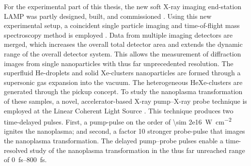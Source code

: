 %
For the experimental part of this thesis, the new soft X-ray imaging end-station LAMP was partly designed, built, and commissioned \citep{Ferguson-2015-JSR}. Using this new experimental setup, a coincident single particle imaging and time-of-flight mass spectroscopy method is employed \cite{Gorkhover-2012-PRL}. Data from multiple imaging detectors are merged, which increases the overall total detector area and extends the dynamic range of the overall detector system. This allows the measurement of diffraction images from single nanoparticles with thus far unprecedented resolution. The superfluid He-droplets and solid Xe-clusters nanoparticles are formed through a supersonic gas expansion into the vacuum. The heterogeneous HeXe-clusters are generated through the pickup concept. To study the nanoplasma transformation of these samples, a novel, accelerator-based X-ray pump--X-ray probe technique is employed at the Linear Coherent Light Source \cite{Lutman-2013-PRL}. This technique produces two time-delayed pulses. First, a pump-pulse on the order of \SI{\sim 2e16}{\watt\per\square\centi\meter} ignites the nanoplasma; and second, a factor 10 stronger probe-pulse that images the nanoplasma transformation. The delayed pump--probe pulses enable a time-resolved study of the nanoplasma transformation in the thus far unreached range of \SIrange{0}{800}{\femto\second}.\\[1\baselineskip]
